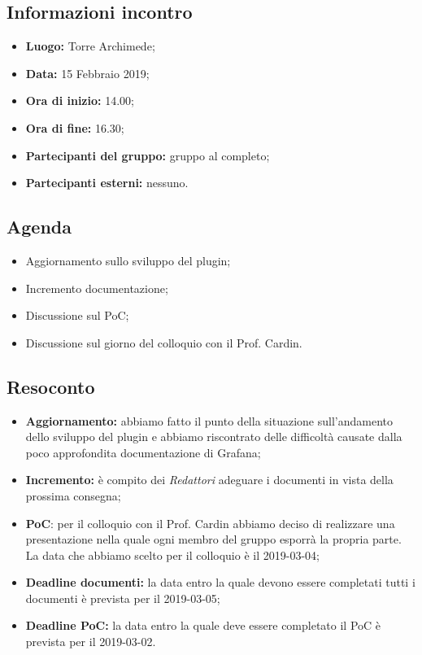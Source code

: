 \subsection{Informazioni incontro}
\begin{itemize}
	\item { \textbf{Luogo:} Torre Archimede};
	\item { \textbf{Data:} 15 Febbraio 2019};
	\item { \textbf{Ora di inizio:} 14.00};
	\item { \textbf{Ora di fine:} 16.30};
	\item { \textbf{Partecipanti del gruppo:} gruppo al completo};
	\item { \textbf{Partecipanti esterni:} nessuno}.
\end{itemize}


\subsection{Agenda}
\begin{itemize}
	\item {Aggiornamento sullo sviluppo del plugin;}
	\item {Incremento documentazione;}
	\item {Discussione sul PoC;}
	\item {Discussione sul giorno del colloquio con il Prof. Cardin.}
\end{itemize}

\subsection{Resoconto}
\begin{itemize}
	\item { \textbf{Aggiornamento:} abbiamo fatto il punto della situazione sull'andamento dello sviluppo del plugin e abbiamo riscontrato delle difficoltà causate dalla poco approfondita documentazione di Grafana;}
	\item { \textbf{Incremento:} è compito dei \emph{Redattori} adeguare i documenti  in vista della prossima consegna;}
	\item { \textbf{PoC}: per il colloquio con il Prof. Cardin abbiamo deciso di realizzare una presentazione nella quale ogni membro del gruppo esporrà la propria parte. La data che abbiamo scelto per il colloquio è il 2019-03-04;}
	\item { \textbf{Deadline documenti:} la data entro la quale devono essere completati tutti i documenti è prevista per il 2019-03-05;}
	\item { \textbf{Deadline PoC:} la data entro la quale deve essere completato il PoC è prevista per il 2019-03-02.}
\end{itemize}

